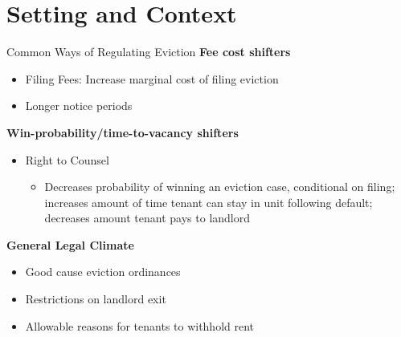 \documentclass[10pt, xcolor=dvipsnames]{beamer}
\begin{document}
\section{Setting and Context}
\begin{frame}{Common Ways of Regulating Eviction}
    \textbf{Fee cost shifters}
    \begin{itemize}
        \item Filing Fees: Increase marginal cost of filing eviction
        \item Longer notice periods
    \end{itemize}
    \textbf{Win-probability/time-to-vacancy shifters}
    \begin{itemize}
        \item Right to Counsel
    \begin{itemize}
        \item Decreases probability of winning an eviction case, conditional on filing; increases amount of time tenant can stay in unit following default; decreases amount tenant pays to landlord
    \end{itemize}
    \end{itemize}
    \textbf{General Legal Climate}
    \begin{itemize}
        \item Good cause eviction ordinances
        \item Restrictions on landlord exit
        \item Allowable reasons for tenants to withhold rent
    \end{itemize}
    
    
\end{frame}
\end{document}
